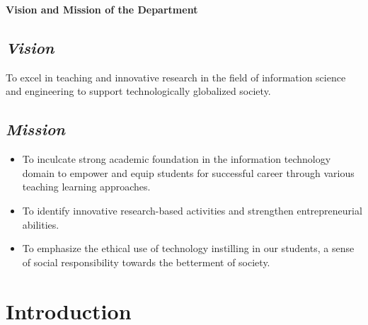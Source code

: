 \documentclass[12pt,a4paper]{report}
\begin{document}
\newpage
\begin{center}
  {\Large\bfseries Vision and Mission of the Department}
\end{center}
\vspace{0.5cm}
\thispagestyle{empty}

\section*{\textit{Vision}}
To excel in teaching and innovative research in the field of information science and engineering to support technologically globalized society.

\section*{\textit{Mission}}
\begin{itemize}
  \item To inculcate strong academic foundation in the information technology domain to empower and equip students for successful career through various teaching learning approaches.
  \item To identify innovative research-based activities and strengthen entrepreneurial abilities.
  \item To emphasize the ethical use of technology instilling in our students, a sense of social responsibility towards the betterment of society.
\end{itemize}

\newpage
\renewcommand{\contentsname}{Table of Contents}
\tableofcontents
\thispagestyle{empty}

\AddToShipoutPicture*{}

\clearpage
{}
\pagestyle{mainstyle}


\chapter{Introduction}
\end{document}
